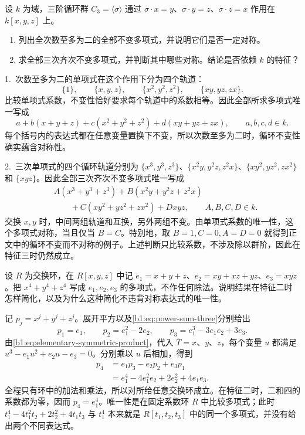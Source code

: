 \begin{exercise}\label{b1:ex:12-cyclic-polynomial-invariants}
	设 \(k\) 为域，三阶循环群 \(C_3=\langle\sigma\rangle\) 通过 \(\sigma\cdot x=y\)、\(\sigma\cdot y=z\)、\(\sigma\cdot z=x\) 作用在 \(k[x,y,z]\) 上。
	\begin{enumerate}
		\item 列出全次数至多为二的全部不变多项式，并说明它们是否一定对称。
		\item 求全部三次齐次不变多项式，并判断其中哪些对称。结论是否依赖 \(k\) 的特征？
	\end{enumerate}
\end{exercise}
\begin{solution}
	1.\ 次数至多为二的单项式在这个作用下分为四个轨道：
	\[
		\{1\},\qquad \{x,y,z\},\qquad \{x^2,y^2,z^2\},\qquad \{xy,yz,zx\}.
	\]
	比较单项式系数，不变性恰好要求每个轨道中的系数相等。因此全部所求多项式唯一写成
	\[
		a+b(x+y+z)+c(x^2+y^2+z^2)+d(xy+yz+zx), \qquad a,b,c,d\in k.
	\]
	每个括号内的表达式都在任意变量置换下不变，所以次数至多为二时，循环不变性确实蕴含对称性。

	2.\ 三次单项式的四个循环轨道分别为 \(\{x^3,y^3,z^3\}\)、\(\{x^2y,y^2z,z^2x\}\)、\(\{xy^2,yz^2,zx^2\}\) 和 \(\{xyz\}\)。因此全部三次齐次不变多项式唯一写成
	\[
		\begin{aligned}
			&A(x^3+y^3+z^3)+B(x^2y+y^2z+z^2x)\\
			&\qquad+C(xy^2+yz^2+zx^2)+Dxyz, \qquad A,B,C,D\in k.
		\end{aligned}
	\]
	交换 \(x,y\) 时，中间两组轨道和互换，另外两组不变。由单项式系数的唯一性，这个多项式对称，当且仅当 \(B=C\)。特别地，取 \(B=1,C=0,A=D=0\) 就得到正文中的循环不变而不对称的例子。上述判断只比较系数，不涉及除以群阶，因此在特征三时仍然成立。
\end{solution}

\begin{exercise}\label{b1:ex:12-symmetric-fourth-power}
	设 \(R\) 为交换环，在 \(R[x,y,z]\) 中记 \(e_1=x+y+z\)、\(e_2=xy+xz+yz\)、\(e_3=xyz\)。把 \(x^4+y^4+z^4\) 写成 \(e_1,e_2,e_3\) 的多项式，不作任何除法。说明结果在特征二时怎样简化，以及为什么这种简化不违背对称表达式的唯一性。
\end{exercise}
\begin{solution}
	记 \(p_j=x^j+y^j+z^j\)。展开平方以及\eqref{b1:eq:power-sum-three}分别给出
	\[
		p_1=e_1,\qquad p_2=e_1^2-2e_2,\qquad p_3=e_1^3-3e_1e_2+3e_3.
	\]
	由\eqref{b1:eq:elementary-symmetric-product}，代入 \(T=x\)、\(y\)、\(z\)，每个变量 \(u\) 都满足 \(u^3-e_1u^2+e_2u-e_3=0\)。分别乘以 \(u\) 后相加，得到
	\[
		\begin{aligned}
			p_4&=e_1p_3-e_2p_2+e_3p_1\\
			&=e_1^4-4e_1^2e_2+2e_2^2+4e_1e_3.
		\end{aligned}
	\]
	全程只有环中的加法和乘法，所以对所给任意交换环成立。在特征二时，二和四的系数都为零，因而 \(p_4=e_1^4\)。唯一性是在固定系数环 \(R\) 中比较多项式；此时 \(t_1^4-4t_1^2t_2+2t_2^2+4t_1t_3\) 与 \(t_1^4\) 本来就是 \(R[t_1,t_2,t_3]\) 中的同一个多项式，并没有给出两个不同表达式。
\end{solution}


